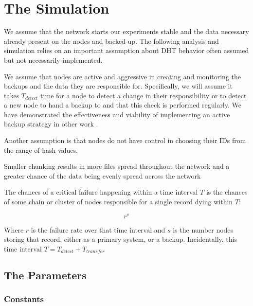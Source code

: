 \section{The Simulation}


We assume that the network starts our experiments stable and the data necessary already present on the nodes and backed-up.
The following analysis and simulation relies on an important assumption about DHT behavior often assumed but not necessarily implemented.

We assume that nodes are active and aggressive in creating and monitoring the backups and the data they are responsible for.
Specifically, we will assume it takes  $T_{detect}$ time for a node to detect a change in their responsibility or to detect a new node to hand a backup to and that this check is performed regularly. 
We have demonstrated the effectiveness and viability of implementing an active backup strategy in other work \cite{chordreduce} \cite{urdht}.


Another assumption is that nodes do not have control in choosing their IDs from the range of hash values.

Smaller chunking results in more files spread throughout the  network and a greater chance of the data being evenly spread across the network 

The chances of a critical failure happening within a time interval $ T $ is the chances of some chain or cluster of nodes responsible for a single record dying within $ T $:

$$r^{s}$$

Where $ r $ is the failure rate over that time interval and $s$ is the number nodes storing that record, either as a primary system, or a backup.
Incidentally, this time interval $T = T_{detect} + T_{transfer} $



\subsection{The Parameters}

\subsubsection{Constants}

